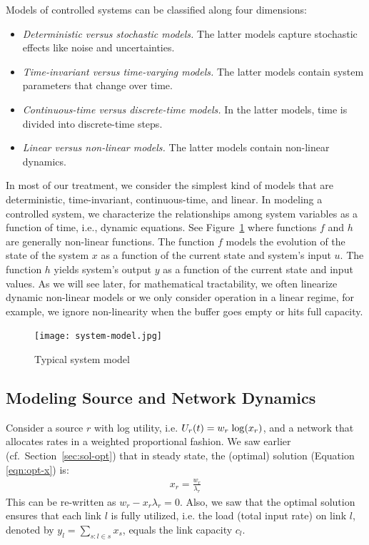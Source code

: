 \documentclass{article}
\def\lg{{\rm log}}
\begin{document}
Models of controlled systems can be classified along four dimensions:
\begin{itemize}
\item {\em Deterministic versus stochastic models.} The latter models capture stochastic effects like noise and uncertainties.

\item {\em Time-invariant versus time-varying models.} The latter models contain system parameters that change over time.

\item {\em Continuous-time versus discrete-time models.} In the latter models, time is divided into discrete-time steps.

\item {\em Linear versus non-linear models.} The latter models contain non-linear dynamics.
 
\end{itemize}
In most of our treatment, we consider the simplest kind of models that are deterministic, time-invariant, continuous-time, and linear. In modeling a controlled system, we characterize the relationships among system variables as a function of time, i.e., dynamic equations. See Figure~\ref{fig:system-model} where functions $f$ and $h$ are generally non-linear functions. 
The function $f$ models the evolution of the state of the system $x$ as 
a function of the current state and system's input $u$.
The function $h$ yields system's output $y$ as a function of the current state and input values.
As we will see later, for mathematical tractability, we often linearize dynamic non-linear models or 
we only consider operation in a linear regime, for example, we ignore non-linearity when 
the buffer goes empty or hits full capacity.
\begin{figure}[htbp]
   \centering
   \texttt{[image: system-model.jpg]} %
   \caption{Typical system model}
   \label{fig:system-model}
\end{figure}

\subsection{Modeling Source and Network Dynamics}

Consider a source $r$ with log utility, i.e. $U_r(t) = w_r \; \lg(x_r)$, and 
a network that allocates rates in a weighted proportional fashion.
We saw earlier (cf.\ Section~\ref{sec:sol-opt}) that in steady state, the (optimal) solution (Equation \ref{eqn:opt-x}) is:
\begin{eqnarray}
x_r = \frac{w_r}{\lambda_r}
\label{eqn:kkt}
\end{eqnarray}
This can be re-written as $w_r - x_r \lambda_r = 0$.
Also, we saw that the optimal solution ensures that each link $l$ is fully utilized,
i.e. the load (total input rate) on link $l$, denoted by $y_l = \sum_{s: l \in s} x_s$, equals the link capacity $c_l$.
\end{document}
